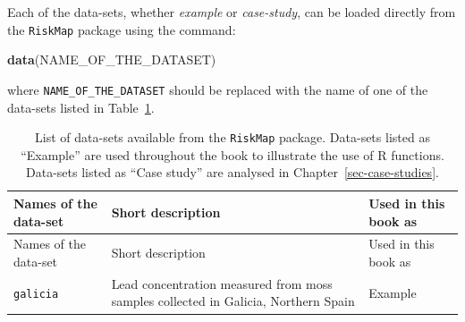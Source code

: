 \documentclass[
  letterpaper,
]{krantz}
\newenvironment{Shaded}{\begin{snugshade}}{\end{snugshade}}
\newcommand{\FunctionTok}[1]{\textcolor[rgb]{0.13,0.29,0.53}{\textbf{#1}}}
\newcommand{\NormalTok}[1]{#1}
\begin{document}
Each of the data-sets, whether \emph{example} or \emph{case-study}, can
be loaded directly from the \texttt{RiskMap} package using the command:

\begin{Shaded}
\begin{Highlighting}[]
\FunctionTok{data}\NormalTok{(NAME\_OF\_THE\_DATASET)}
\end{Highlighting}
\end{Shaded}

where \texttt{NAME\_OF\_THE\_DATASET} should be replaced with the name
of one of the data-sets listed in Table~\ref{tbl-data-sets}.

\begin{longtable}[]{@{}
  >{\raggedright\arraybackslash}p{}
  >{\raggedright\arraybackslash}p{}
  >{\raggedright\arraybackslash}p{}@{}}
\caption{List of data-sets available from the \texttt{RiskMap} package.
Data-sets listed as ``Example'' are used throughout the book to
illustrate the use of R functions. Data-sets listed as ``Case study''
are analysed in
Chapter~\ref{sec-case-studies}.}\label{tbl-data-sets}\tabularnewline
\toprule\noalign{}
\begin{minipage}[b]{\linewidth}\raggedright
Names of the data-set
\end{minipage} & \begin{minipage}[b]{\linewidth}\raggedright
Short description
\end{minipage} & \begin{minipage}[b]{\linewidth}\raggedright
Used in this book as
\end{minipage} \\
\midrule\noalign{}
\endfirsthead
\toprule\noalign{}
\begin{minipage}[b]{\linewidth}\raggedright
Names of the data-set
\end{minipage} & \begin{minipage}[b]{\linewidth}\raggedright
Short description
\end{minipage} & \begin{minipage}[b]{\linewidth}\raggedright
Used in this book as
\end{minipage} \\
\midrule\noalign{}
\endhead
\bottomrule\noalign{}
\endlastfoot
\texttt{galicia} & Lead concentration measured from moss samples
collected in Galicia, Northern Spain & Example \\

\end{longtable}
\end{document}
